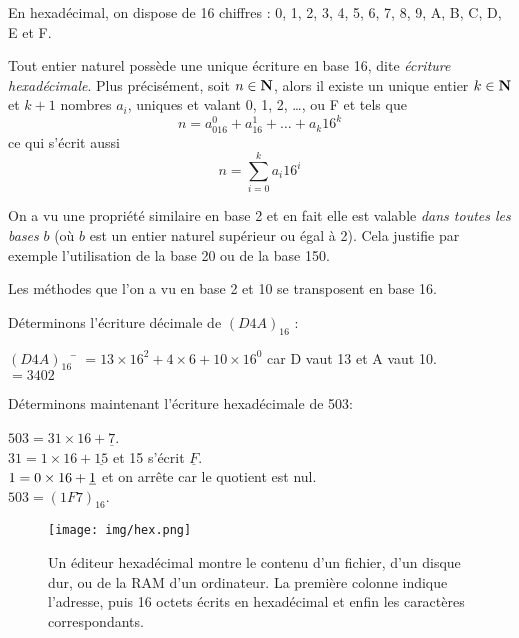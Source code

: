 En hexadécimal, on dispose de 16 chiffres : 0, 1, 2, 3, 4, 5, 6, 7, 8, 9, A, B, C, D, E et F.

\begin{propriete}
    Tout entier naturel possède une unique écriture en base 16, dite \textit{écriture hexadécimale}.
    Plus précisément, soit $n\in\mathbf{N}$, alors il existe un unique entier $k\in\mathbf{N}$ et $k+1$ nombres $a_i$, uniques et valant 0, 1, 2, \ldots, ou F et tels
    que $$n=a_016^0+a_16^1+\ldots+a_k16^k$$
    ce qui s'écrit aussi
    $$n=\sum_{i=0}^ka_i16^i$$
\end{propriete}

\begin{remarque}
    On a vu une propriété similaire en base 2 et en fait elle est valable \textit{dans toutes les bases}  $b$ (où $b$ est un entier naturel supérieur ou
    égal à 2). Cela justifie par exemple l'utilisation de la base 20 ou de la base 150.
\end{remarque}

Les méthodes que l'on a vu en base 2 et 10 se transposent en base 16.
\begin{methode}
    Déterminons l'écriture décimale de $(D4A)_{16}$ :
    \begin{tabbing}
        $(D4A)_{16}$  	\= $=13\times 16^2 + 4\times 6 + 10\times 16^0$	 car D vaut 13 et A vaut 10.\\
        \>	$=3402$
    \end{tabbing}
\end{methode}
\begin{methode}
    Déterminons maintenant l'écriture hexadécimale de 503:

$503 = 31 \times 16 + \underline{7}$.\\

$31 = 1\times 16 + \underline{15}$ et 15 s'écrit $\underline{F}$.\\

$1 = {\boldmath 0}\times 16 + \underline{1}$ et on arrête car le quotient est nul.\\

$503=(1F7)_{16}$.\\

\end{methode}
\begin{figure}[H]
    \begin{center}
        \texttt{[image: img/hex.png]}\\
        \caption*{Un éditeur hexadécimal montre le contenu d'un fichier, d'un disque dur, ou de la RAM d'un ordinateur. La première colonne indique l'adresse,
            puis 16 octets écrits en hexadécimal et enfin les caractères correspondants.}
    \end{center}
\end{figure}
